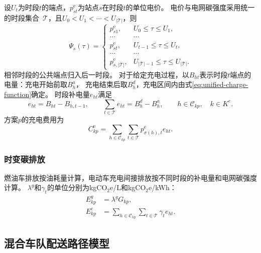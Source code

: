 \documentclass{setp-new}
\begin{document}
设$U_t$为时段$t$的端点，$p_{st}^{\mathrm e}$为站点$s$在时段$t$的单位电价。
电价与电网碳强度采用统一的时段集合~$\mathcal T$，且$U_0<U_1<\cdots<U_{|\mathcal T|}$\cite{ref:94}，则
\begin{equation}
\Psi_s(\tau)=
\begin{cases}
p_{s1}^{\mathrm e}, & U_0\le\tau\le U_1,\\
\cdots & \cdots\\
p_{st}^{\mathrm e}, & U_{t-1}\le\tau\le U_t,\\
\cdots & \cdots\\
p_{s,|\mathcal T|}^{\mathrm e}, & U_{|\mathcal T|-1}\le\tau\le U_{|\mathcal T|}.
\end{cases}
\label{eq:unified-price-function}
\end{equation}
相邻时段的公共端点归入后一时段。
对于给定充电过程，以$B_{ht}$表示时段$t$端点的电量：充电开始前取$B_h^{a}$，
充电结束后取$B_h^{d}$，充电区间内由式\eqref{eq:unified-charge-function}确定。
时段补电量$e_{ht}$满足\cite{ref:94}
\begin{equation}
e_{ht}=B_{ht}-B_{h,t-1},\qquad
\sum_{t\in\mathcal T}e_{ht}=B_h^{d}-B_h^{a},\qquad
h\in\mathcal C_{kp},\quad k\in K^{e}.
\label{eq:unified-charge-balance}
\end{equation}
方案$p$的充电费用为
\begin{equation}
C_{kp}^{\mathrm e}
=\sum_{h\in\mathcal C_{kp}}\sum_{t\in\mathcal T}
p_{\sigma(h),t}^{\mathrm e}e_{ht}.
\label{eq:unified-charge-cost}
\end{equation}

\subsubsection{时变碳排放}

燃油车排放按油耗量计算，电动车充电间接排放按不同时段的补电量和电网碳强度计算\cite{ref:deng}。
$\lambda^{g}$和$\gamma_t$的单位分别为kgCO$_2$e/L和kgCO$_2$e/kWh：
\begin{align}
E_{kp}^{g}&=\lambda^{g}G_{kp},
\label{eq:unified-direct-emission}\\
E_{kp}^{e}&=\sum_{h\in\mathcal C_{kp}}\sum_{t\in\mathcal T}\gamma_t e_{ht}.
\label{eq:unified-indirect-emission}
\end{align}

\subsection{混合车队配送路径模型}
\end{document}
